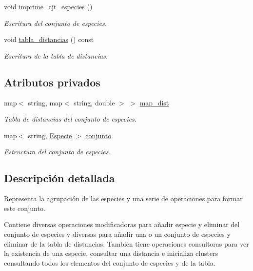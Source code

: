 \begin{DoxyCompactItemize}
void \hyperlink{class_cjt___especies_a61b0168970e926d3a27faf3f31ad2869}{imprime\+\_\+cjt\+\_\+especies} ()
\begin{DoxyCompactList}\small\item\em Escritura del conjunto de especies. \end{DoxyCompactList}\item 
void \hyperlink{class_cjt___especies_a539b1f0c4b31a868e5961dc9a6920497}{tabla\+\_\+distancias} () const
\begin{DoxyCompactList}\small\item\em Escritura de la tabla de distancias. \end{DoxyCompactList}\end{DoxyCompactItemize}
\subsection*{Atributos privados}
\begin{DoxyCompactItemize}
\item 
map$<$ string, map$<$ string, double $>$ $>$ \hyperlink{class_cjt___especies_a9b104014aea0c1472ba4e7d7fc785e9a}{map\+\_\+dist}
\begin{DoxyCompactList}\small\item\em Tabla de distancias del conjunto de especies. \end{DoxyCompactList}\item 
map$<$ string, \hyperlink{class_especie}{Especie} $>$ \hyperlink{class_cjt___especies_a82ed53cbd620caca3db6b5c20b37a60a}{conjunto}
\begin{DoxyCompactList}\small\item\em Estructura del conjunto de especies. \end{DoxyCompactList}\end{DoxyCompactItemize}


\subsection{Descripción detallada}
Representa la agrupación de las especies y una serie de operaciones para formar este conjunto. 

Contiene diversas operaciones modificadoras para añadir especie y eliminar del conjunto de especies y diversas para añadir una o un conjunto de especies y eliminar de la tabla de distancias. También tiene operaciones consultoras para ver la existencia de una especie, consultar una distancia e inicializa clusters consultando todos los elementos del conjunto de especies y de la tabla.

